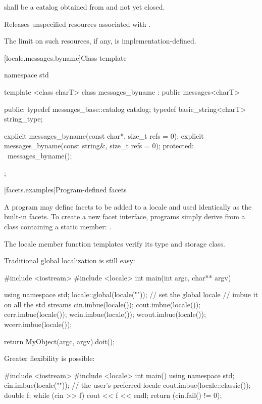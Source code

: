 \begin{itemdescr}
\pnum
\requires
{} shall be a catalog obtained from
and not yet closed.

\pnum
\effects
Releases unspecified resources associated with  .

\pnum
\notes
The limit on such resources, if any, is implementation-defined.
\end{itemdescr}

[locale.messages.byname]{Class template }

%
\begin{codeblock}
namespace std {
  template <class charT>
  class messages_byname : public messages<charT> {
  public:
    typedef messages_base::catalog catalog;
    typedef basic_string<charT>    string_type;

    explicit messages_byname(const char*, size_t refs = 0);
    explicit messages_byname(const string&, size_t refs = 0);
  protected:
    ~messages_byname();
  };
}
\end{codeblock}

[facets.examples]{Program-defined facets}

\pnum
A \Cpp program may define facets to be added to a locale and used identically as
the built-in facets.
To create a new facet interface, \Cpp programs simply derive from
a class containing a static member:
.

\pnum
\enternote
The locale member function templates verify its type and storage class.
\exitnote

\pnum
\enterexample
Traditional global localization is still easy:

\begin{codeblock}
#include <iostream>
#include <locale>
int main(int argc, char** argv) {
  using namespace std;
  locale::global(locale(""));           // set the global locale
                                        // imbue it on all the std streams
  cin.imbue(locale());
  cout.imbue(locale());
  cerr.imbue(locale());
  wcin.imbue(locale());
  wcout.imbue(locale());
  wcerr.imbue(locale());

  return MyObject(argc, argv).doit();
}
\end{codeblock}
\exitexample

\pnum
\enterexample
Greater flexibility is possible:

\begin{codeblock}
#include <iostream>
#include <locale>
int main() {
  using namespace std;
  cin.imbue(locale(""));        // the user's preferred locale
  cout.imbue(locale::classic());
  double f;
  while (cin >> f) cout << f << endl;
  return (cin.fail() != 0);
}
\end{codeblock}

